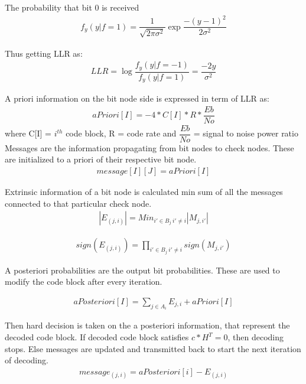 The probability that bit 0 is received 
\begin{align} f_y(y|f=1) = \dfrac{1}{\sqrt{2\pi\sigma^{2}}} \exp{\dfrac{-(y-1)^2}{2\sigma^2}}
 \end{align}
 
Thus getting LLR as:
\begin{align}  LLR = \log\dfrac{f_y(y|f=-1)}{f_y(y|f=1)} = \dfrac{-2y}{\sigma^2}
 \end{align}
 
A priori information on the bit node side is expressed in term of LLR as: 
\begin{align}  aPriori[I] = -4 * C[I] * R * \dfrac{Eb}{No} 
 \end{align}
where C[I] = $i^{th}$ code block, R = code rate and 
$\dfrac{Eb}{No}$ = signal to noise power ratio\\
	
Messages are the information propagating from bit nodes to check nodes.
These are initialized to a priori of their respective bit node.	
\begin{align} message[I][J] = aPriori[I] 
 \end{align}
 
Extrinsic information of a bit node is calculated min sum of all the messages connected to 
	that particular check node. 
\begin{align} |E_{(j,i)}| =  Min_{i'\in B_j \ i'\neq i }|M_{j,i'}|   
 \end{align}

\begin{align} sign({E_{(j,i)}}) =  \prod_{i'\in B_j \ i'\neq i }sign(M_{j,i'})   
 \end{align}
 
A posteriori probabilities are the output bit probabilities.
These are used to modify the code block after every iteration.

\begin{align}  aPosteriori[I] = \sum_{j\in A_i} E_{j,i} + aPriori[I] 
 \end{align}
	
Then hard decision is taken on the a posteriori information, that represent the decoded code block.
If decoded code block satisfies $c*H^{T} = 0 $, then decoding stops. Else messages are updated and transmitted back to start the next iteration of decoding.
\begin{align}   message_{(j,i)} = aPosteriori[i] - E_{(j,i)}  
 \end{align}	


